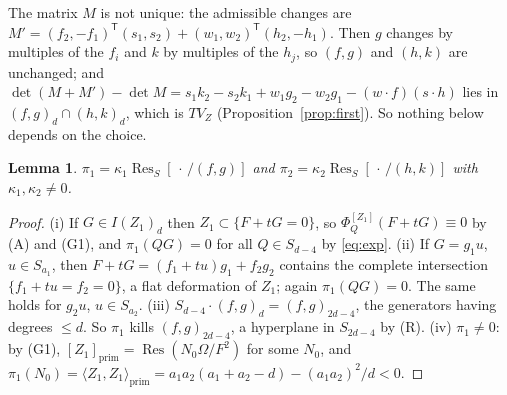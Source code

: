 \documentclass[11pt]{article}
\numberwithin{equation}{section}
\newtheorem{lemma}[theorem]{Lemma}
\theoremstyle{remark}
\newcommand{\VZ}{V_Z}
\newcommand{\Res}{\operatorname{Res}}
\begin{document}
The matrix $M$ is not unique: the admissible changes are
$M'=(f_2,-f_1)^{\mathsf T}(s_1,s_2)+(w_1,w_2)^{\mathsf T}(h_2,-h_1)$. Then $g$ changes by multiples of the $f_i$
and $k$ by multiples of the $h_j$, so $(f,g)$ and $(h,k)$ are unchanged; and
$\det(M+M')-\det M=s_1k_2-s_2k_1+w_1g_2-w_2g_1-(w\cdot f)(s\cdot h)$ lies in $(f,g)_d\cap(h,k)_d$, which is $T\VZ$
(Proposition~\ref{prop:first}). So nothing below depends on the choice.

\begin{lemma}\label{lem:pi}
$\pi_1=\kappa_1\Res_S[\,\cdot\,/(f,g)]$ and $\pi_2=\kappa_2\Res_S[\,\cdot\,/(h,k)]$ with $\kappa_1,\kappa_2\ne0$.
\end{lemma}
\begin{proof}
(i) If $G\in I(Z_1)_d$ then $Z_1\subset\{F+tG=0\}$, so $\Phi^{[Z_1]}_Q(F+tG)\equiv0$ by (A) and (G1), and
$\pi_1(QG)=0$ for all $Q\in S_{d-4}$ by \eqref{eq:exp}. (ii) If $G=g_1u$, $u\in S_{a_1}$, then
$F+tG=(f_1+tu)g_1+f_2g_2$ contains the complete intersection $\{f_1+tu=f_2=0\}$, a flat deformation of $Z_1$;
again $\pi_1(QG)=0$. The same holds for $g_2u$, $u\in S_{a_2}$. (iii) $S_{d-4}\cdot(f,g)_d=(f,g)_{2d-4}$, the
generators having degrees $\le d$. So $\pi_1$ kills $(f,g)_{2d-4}$, a hyperplane in $S_{2d-4}$ by (R).
(iv) $\pi_1\neq0$: by (G1), $[Z_1]_{\mathrm{prim}}=\Res(N_0\Omega/F^2)$ for some $N_0$, and
$\pi_1(N_0)=\langle Z_1,Z_1\rangle_{\mathrm{prim}}=a_1a_2(a_1+a_2-d)-(a_1a_2)^2/d<0$.
\end{proof}
\end{document}
